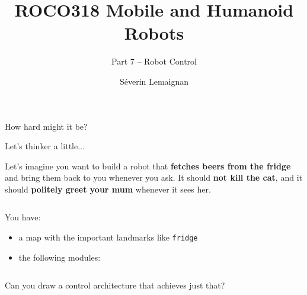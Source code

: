 \documentclass[compress]{beamer}
\title{ROCO318 \newline Mobile and Humanoid Robots}
\subtitle{Part 7 -- Robot Control}
\date{}
\author{Séverin Lemaignan}
\institute{Centre for Neural Systems and Robotics\\{\bf Plymouth University}}
\begin{document}

\maketitle

\begin{frame}[plain]{}

    \Large

    \centering
    How hard might it be?

\end{frame}


\begin{frame}{Let's thinker a little...}

    Let's imagine you want to build a robot that {\bf fetches beers from the fridge}
    and bring them back to you whenever you ask. It should {\bf not kill the cat},
    and it should {\bf politely greet your mum} whenever it sees her.

    \begin{columns}
        \begin{column}{0.5\linewidth}

            You have:
            \begin{itemize}
                \item a map with the important landmarks like {\tt fridge}
                \item the following modules:
            \end{itemize}
        \end{column}
        \begin{column}{0.5\linewidth}
            \begin{center}
            \end{center}
        \end{column}
    \end{columns}

    Can you draw a control architecture that achieves just that?
\end{frame}
\end{document}
